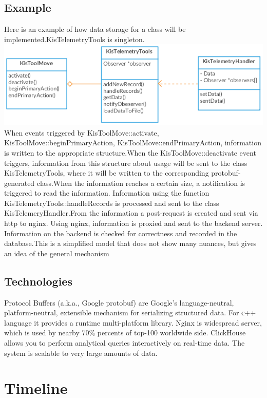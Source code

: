 \documentclass[]{article}
\begin{document}
\subsection{Example}
Here is an example of how data storage for a class will be implemented.KisTelemetryTools is singleton.\\
\includegraphics[scale=0.8]{Tools_uml3}\\
When events triggered by KisToolMove::activate, KisToolMove::beginPrimaryAction, KisToolMove::endPrimaryAction, information is written to the appropriate structure.When the KisToolMove::deactivate event triggers, information from this structure about usage will be sent to the class KisTelemetryTools, where it will be written to the corresponding protobuf-generated class.When the information reaches a certain size, a notification is triggered to read the information. Information using the function KisTelemetryTools::handleRecords is processed and sent to the class KisTelemeryHandler.From the information a post-request is created and sent via http to nginx. Using nginx, information is proxied and sent to the backend server. Information on the backend is checked for correctness and recorded in the database.This is a simplified model that does not show many nuances, but gives an idea of the general mechanism 
\subsection{Technologies}
Protocol Buffers (a.k.a., Google protobuf) are Google's language-neutral, platform-neutral, extensible mechanism for serializing structured data. 
For с++ language it provides a runtime multi-platform library. Nginx is widespread server, which is used by nearby 70\% percents of top-100 worldwide side. ClickHouse allows you to perform analytical queries interactively on real-time data. The system is scalable to very large amounts of data. 



\section{Timeline}
\end{document}
